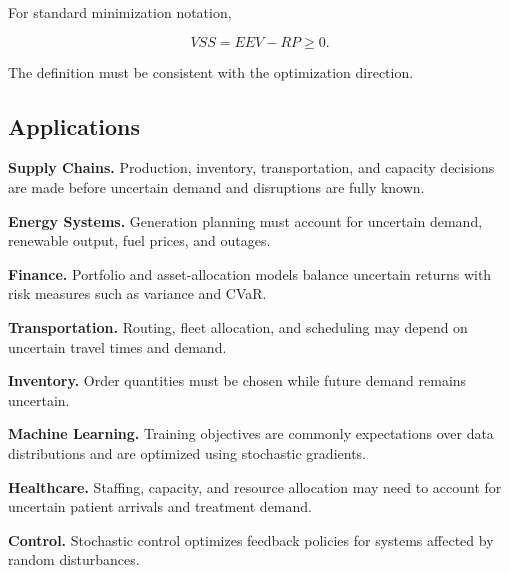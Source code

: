 For standard minimization notation,

\[
\boxed{
VSS=EEV-RP\geq0.
}
\]

The definition must be consistent with the optimization direction.

\subsection{Applications}
\label{subsec:stochastic-optimization-applications}

\begin{applicationbox}

\textbf{Supply Chains.}
Production, inventory, transportation, and capacity decisions are made
before uncertain demand and disruptions are fully known.

\medskip

\textbf{Energy Systems.}
Generation planning must account for uncertain demand, renewable output,
fuel prices, and outages.

\medskip

\textbf{Finance.}
Portfolio and asset-allocation models balance uncertain returns with risk
measures such as variance and CVaR.

\medskip

\textbf{Transportation.}
Routing, fleet allocation, and scheduling may depend on uncertain travel
times and demand.

\medskip

\textbf{Inventory.}
Order quantities must be chosen while future demand remains uncertain.

\medskip

\textbf{Machine Learning.}
Training objectives are commonly expectations over data distributions and
are optimized using stochastic gradients.

\medskip

\textbf{Healthcare.}
Staffing, capacity, and resource allocation may need to account for
uncertain patient arrivals and treatment demand.

\medskip

\textbf{Control.}
Stochastic control optimizes feedback policies for systems affected by
random disturbances.

\end{applicationbox}

